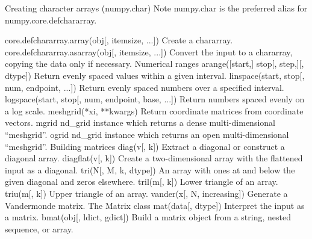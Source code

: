 Creating character arrays (numpy.char)
Note
numpy.char is the preferred alias for numpy.core.defchararray.

core.defchararray.array(obj[, itemsize, ...])	Create a chararray.
core.defchararray.asarray(obj[, itemsize, ...])	Convert the input to a chararray, copying the data only if necessary.
Numerical ranges
arange([start,] stop[, step,][, dtype])	Return evenly spaced values within a given interval.
linspace(start, stop[, num, endpoint, ...])	Return evenly spaced numbers over a specified interval.
logspace(start, stop[, num, endpoint, base, ...])	Return numbers spaced evenly on a log scale.
meshgrid(*xi, **kwargs)	Return coordinate matrices from coordinate vectors.
mgrid	nd_grid instance which returns a dense multi-dimensional “meshgrid”.
ogrid	nd_grid instance which returns an open multi-dimensional “meshgrid”.
Building matrices
diag(v[, k])	Extract a diagonal or construct a diagonal array.
diagflat(v[, k])	Create a two-dimensional array with the flattened input as a diagonal.
tri(N[, M, k, dtype])	An array with ones at and below the given diagonal and zeros elsewhere.
tril(m[, k])	Lower triangle of an array.
triu(m[, k])	Upper triangle of an array.
vander(x[, N, increasing])	Generate a Vandermonde matrix.
The Matrix class
mat(data[, dtype])	Interpret the input as a matrix.
bmat(obj[, ldict, gdict])	Build a matrix object from a string, nested sequence, or array.
